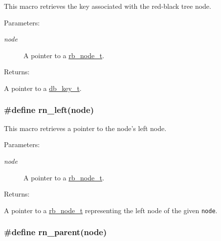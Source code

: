 This macro retrieves the key associated with the red-black tree node.\begin{Desc}
\item[Parameters: ]\par
\begin{description}
\item[{\em 
node}]A pointer to a \hyperlink{group__dbprim__rbtree_a1}{rb\_\-node\_\-t}.\end{description}
\end{Desc}
\begin{Desc}
\item[Returns: ]\par
A pointer to a \hyperlink{group__dbprim_a0}{db\_\-key\_\-t}. \end{Desc}
\hypertarget{group__dbprim__rbtree_a30}{
\subsubsection[rn\_\-left]{\setlength{\rightskip}{0pt plus 5cm}\#define rn\_\-left(node)}}
\label{group__dbprim__rbtree_a30}


This macro retrieves a pointer to the node's left node.\begin{Desc}
\item[Parameters: ]\par
\begin{description}
\item[{\em 
node}]A pointer to a \hyperlink{group__dbprim__rbtree_a1}{rb\_\-node\_\-t}.\end{description}
\end{Desc}
\begin{Desc}
\item[Returns: ]\par
A pointer to a \hyperlink{group__dbprim__rbtree_a1}{rb\_\-node\_\-t} representing the left node of the given {\tt node}. \end{Desc}
\hypertarget{group__dbprim__rbtree_a29}{
\subsubsection[rn\_\-parent]{\setlength{\rightskip}{0pt plus 5cm}\#define rn\_\-parent(node)}}
\label{group__dbprim__rbtree_a29}


